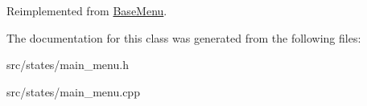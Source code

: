 Reimplemented from \hyperlink{class_base_menu_aa73239e64789bf85c1d510abbae18189}{Base\-Menu}.



The documentation for this class was generated from the following files\-:\begin{DoxyCompactItemize}
\item 
src/states/main\-\_\-menu.\-h\item 
src/states/main\-\_\-menu.\-cpp\end{DoxyCompactItemize}
